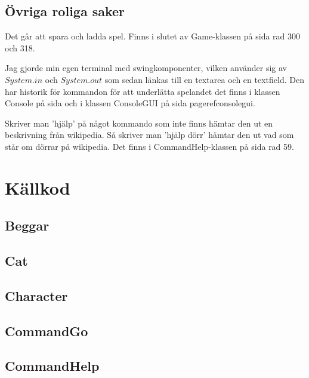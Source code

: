 \documentclass[a4paper,11pt]{article}
\begin{document}
\subsection{Övriga roliga saker}
Det går att spara och ladda spel. Finns i slutet av Game-klassen på sida \pageref{game} rad 300 och 318.

Jag gjorde min egen terminal med swingkomponenter, vilken använder sig av $System.in$ och $System.out$ som sedan länkas
till en textarea och en textfield. Den har historik för kommandon för att underlätta spelandet det finns i klassen Console 
på sida \pageref{console} och i klassen ConsoleGUI på sida pageref{consolegui}.

Skriver man 'hjälp' på något kommando som inte finns hämtar den ut en beskrivning från wikipedia. Så skriver man 'hjälp dörr' hämtar den ut vad som står om dörrar på wikipedia. Det finns i CommandHelp-klassen på sida \pageref{commandhelp} rad 59.
\pagebreak
\section{Källkod}
\subsection{Beggar}
\lstset{label=beggar}

\subsection{Cat}
\lstset{label=cat}

\subsection{Character}
\lstset{label=character}


\subsection{CommandGo}
\lstset{label=commandgo}

\subsection{CommandHelp}
\lstset{label=commandhelp}

\end{document}
